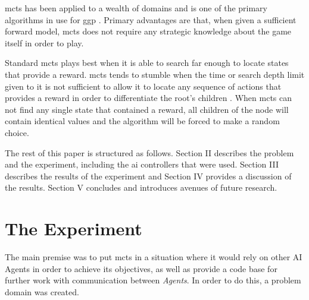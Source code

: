 \documentclass{IEEEtran}
\begin{document}
\gls{mcts} \cite{browne2012survey} has been applied to a wealth of domains and is one of the primary algorithms in use for \gls{ggp} \cite{finnsson2008simulation}. Primary advantages are that, when given a sufficient forward model, \gls{mcts} does not require any strategic knowledge about the game itself in order to play.

Standard \gls{mcts} plays best when it is able to search far enough to locate states that provide a reward. \gls{mcts} tends to stumble when the time or search depth limit given to it is not sufficient to allow it to locate any sequence of actions that provides a reward in order to differentiate the root's children \cite{perez2012monte}. When \gls{mcts} can not find any single state that contained a reward, all children of the node will contain identical values and the algorithm will be forced to make a random choice.

The rest of this paper is structured as follows. Section II describes the problem and the experiment, including the \gls{ai} controllers that were used. Section III describes the results of the experiment and Section IV provides a discussion of the results. Section V concludes and introduces avenues of future research.
\section{The Experiment}
The main premise was to put \gls{mcts} in a situation where it would rely on other AI Agents in order to achieve its objectives, as well as provide a code base for further work with communication between \emph{Agents}. In order to do this, a problem domain was created.
\end{document}

